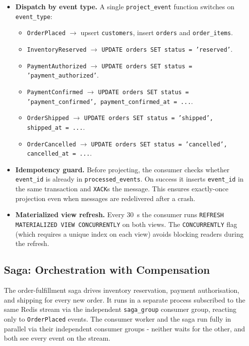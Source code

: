 \documentclass[11pt,a4paper]{article}
\newcommand{\code}[1]{\texttt{\small #1}}
\begin{document}
\begin{itemize}
  \item \textbf{Dispatch by event type.} A single \code{project\_event} function switches on \code{event\_type}:
    \begin{itemize}
      \item \code{OrderPlaced} $\to$ upsert \code{customers}, insert \code{orders} and \code{order\_items}.
      \item \code{InventoryReserved} $\to$ \code{UPDATE orders SET status = 'reserved'}.
      \item \code{PaymentAuthorized} $\to$ \code{UPDATE orders SET status = 'payment\_authorized'}.
      \item \code{PaymentConfirmed} $\to$ \code{UPDATE orders SET status = 'payment\_confirmed', payment\_confirmed\_at = ...}.
      \item \code{OrderShipped} $\to$ \code{UPDATE orders SET status = 'shipped', shipped\_at = ...}.
      \item \code{OrderCancelled} $\to$ \code{UPDATE orders SET status = 'cancelled', cancelled\_at = ...}.
    \end{itemize}
  \item \textbf{Idempotency guard.} Before projecting, the consumer checks whether \code{event\_id} is already in \code{processed\_events}. On success it inserts \code{event\_id} in the same transaction and \code{XACK}s the message. This ensures exactly-once projection even when messages are redelivered after a crash.
  \item \textbf{Materialized view refresh.} Every 30~s the consumer runs \code{REFRESH MATERIALIZED VIEW CONCURRENTLY} on both views. The \code{CONCURRENTLY} flag (which requires a unique index on each view) avoids blocking readers during the refresh.
\end{itemize}

\subsection{Saga: Orchestration with Compensation}

The order-fulfillment saga drives inventory reservation, payment authorisation, and
shipping for every new order. It runs in a separate process subscribed to the same
Redis stream via the independent \code{saga\_group} consumer group, reacting only to
\code{OrderPlaced} events. The consumer worker and the saga run fully in parallel via
their independent consumer groups - neither waits for the other, and both see every
event on the stream.
\end{document}
